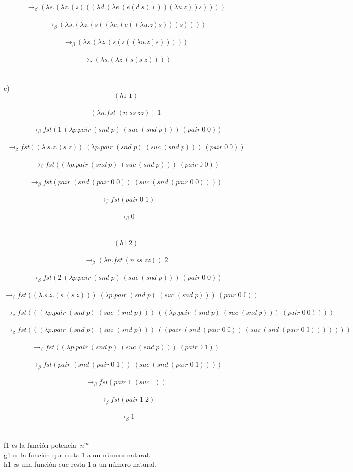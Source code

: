 \documentclass{article}
\begin{document}
\begin{flushleft}
\[\rightarrow_{\beta}(\lambda s.(\lambda z.(s(((\lambda d.(\lambda e.(e(d\;s))))(\lambda u.z))s))))\] \\

\[\rightarrow_{\beta}(\lambda s.(\lambda z.(s((\lambda e.(e((\lambda u.z)s)))s))))\] \\

\[\rightarrow_{\beta}(\lambda s.(\lambda z.(s(s((\lambda u.z)s)))))\] \\

\[\rightarrow_{\beta}(\lambda s.(\lambda z.(s(s\;z))))\]
\\ \ \\
	c) \\
	\[(h1\;1)\] \\
\[(\lambda n.fst\;(n\;ss\;zz))\;1\] \\
\[\rightarrow_{\beta}fst(1\;(\lambda p.pair\;(snd\;p)\;(suc\;(snd\;p)))\;(pair\;0\;0))\] \\
\[\rightarrow_{\beta}fst((\lambda .s.z.(s\;z))\;(\lambda p.pair\;(snd\;p)\;(suc\;(snd\;p)))\;(pair\;0\;0))\] \\
\[\rightarrow_{\beta}fst((\lambda p.pair\;(snd\;p)\;(suc\;(snd\;p)))\;(pair\;0\;0))\] \\
\[\rightarrow_{\beta}fst(pair\;(snd\;(pair\;0\;0))\;(suc\;(snd\;(pair\;0\;0))))\] \\
\[\rightarrow_{\beta}fst(pair\;0\;1)\] \\
\[\rightarrow_{\beta}0\]
	\\ \ \\
	\[(h1\;2)\] \\
\[\rightarrow_{\beta}(\lambda n.fst\;(n\;ss\;zz))\;2\] \\
\[\rightarrow_{\beta}fst(2\;(\lambda p.pair\;(snd\;p)\;(suc\;(snd\;p)))\;(pair\;0\;0))\] \\
\[\rightarrow_{\beta}fst((\lambda .s.z.(s\;(s\;z)))\;(\lambda p.pair\;(snd\;p)\;(suc\;(snd\;p)))\;(pair\;0\;0))\] \\
\[\rightarrow_{\beta}fst(((\lambda p.pair\;(snd\;p)\;(suc\;(snd\;p)))\;((\lambda p.pair\;(snd\;p)\;(suc\;(snd\;p)))\;(pair\;0\;0))))\] \\
\[\rightarrow_{\beta}fst(((\lambda p.pair\;(snd\;p)\;(suc\;(snd\;p)))\;((pair\;(snd\;(pair\;0\;0))\;(suc\;(snd\;(pair\;0\;0)))))))\] \\
\[\rightarrow_{\beta}fst((\lambda p.pair\;(snd\;p)\;(suc\;(snd\;p)))\;(pair\;0\;1))\] \\
\[\rightarrow_{\beta}fst(pair\;(snd\;(pair\;0\;1))\;(suc\;(snd\;(pair\;0\;1))))\] \\
\[\rightarrow_{\beta}fst(pair\;1\;(suc\;1))\] \\
\[\rightarrow_{\beta}fst(pair\;1\;2)\] \\
\[\rightarrow_{\beta}1\]
\\ \ \\
f1 es la función potencia: $n^{m}$ \\
g1 es la función que resta 1 a un número natural.\\
h1 es una función que resta 1 a un número natural. \\ \ \\


\end{flushleft}
\end{document}

